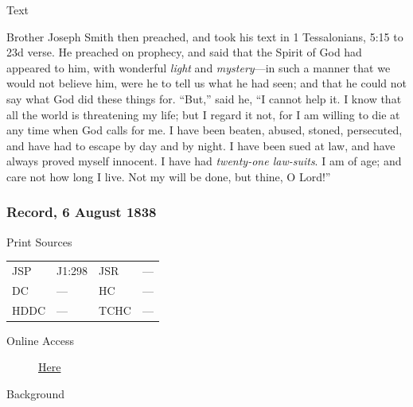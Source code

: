 				\begin{description}
					\item[Text]
				\end{description}
				
					Brother Joseph Smith then preached, and took his text in 1 Tessalonians, 5:15 to 23d verse. He preached on prophecy, and said that the Spirit of God had appeared to him, with wonderful \textit{light} and \textit{mystery}---in such a manner that we would not believe him, were he to tell us what he had seen; and that he could not say what God did these things for. ``But,'' said he, ``I cannot help it. I know that all the world is threatening my life; but I regard it not, for I am willing to die at any time when God calls for me. I have been beaten, abused, stoned, persecuted, and have had to escape by day and by night. I have been sued at law, and have always proved myself innocent. I have had \textit{twenty-one law-suits}. I am of age; and care not how long I live. Not my will be done, but thine, O Lord!''
					
		\subsubsection{Record, 6 August 1838}
			\label{EMS-1836-JS-6-AUG-1838}
			
			\begin{description}
					\item[Print Sources]
				\end{description}

					\begin{tabular}{p{0.5in}p{1in}p{0.5in}p{1in}}
					JSP	 	& J1:298		& JSR 		& --- \\
					DC	 	& ---				& HC 		& --- \\
					HDDC 	& ---				& TCHC 		& --- \\
					\end{tabular}
				
				\begin{description}
					\item[Online Access] \href{https://www.josephsmithpapers.org/paper-summary/journal-march-september-1838/51}{Here}
				\end{description}
				
				\begin{description}
					\item[Background]
				\end{description}
				
